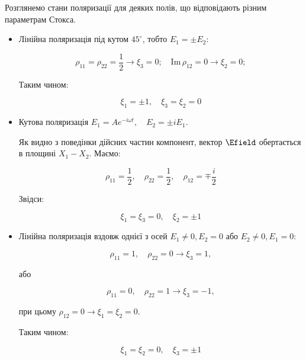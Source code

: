 Розглянемо стани поляризації для деяких полів, що відповідають різним параметрам Стокса.

\begin{itemize}

\item Лінійна поляризація під кутом $45^{\circ}$, тобто \(E_1 = \pm E_2\):

\begin{equation*}
\rho_{11} = \rho_{22} = \frac{1}{2} \rightarrow \xi_3 = 0; \quad \text{Im} \, \rho_{12} = 0 \rightarrow \xi_2 = 0;
\end{equation*}

Таким чином:

\begin{equation*}
\xi_1 = \pm 1, \quad \xi_3 = \xi_2 = 0
\end{equation*}



\item  Кутова поляризація \(E_1 = A e^{-i\omega t}, \quad E_2 = \pm i E_1\).

Як видно з поведінки дійсних частин компонент, вектор \(\Efield\) обертається в площині \(X_1 -
X_2\). Маємо:

\begin{equation*}
\rho_{11} = \frac{1}{2}, \quad \rho_{22} = \frac{1}{2}, \quad \rho_{12} = \mp \frac{i}{2}
\end{equation*}

Звідси:

\begin{equation*}
\xi_1 = \xi_3 = 0, \quad \xi_2 = \pm 1
\end{equation*}

\item Лінійна поляризація вздовж однієї з осей \(E_1 \neq 0, E_2 = 0\) або \(E_2 \neq 0, E_1 = 0\):

\begin{equation*}
\rho_{11} = 1, \quad \rho_{22} = 0 \rightarrow \xi_3 = 1,
\end{equation*}

або

\begin{equation*}
\rho_{11} = 0, \quad \rho_{22} = 1 \rightarrow \xi_3 = -1,
\end{equation*}

при цьому \(\rho_{12} = 0 \rightarrow \xi_1 = \xi_2 = 0\).

Таким чином:

\begin{equation*}
\xi_1 = \xi_2 = 0, \quad \xi_3 = \pm 1
\end{equation*}

\end{itemize}

